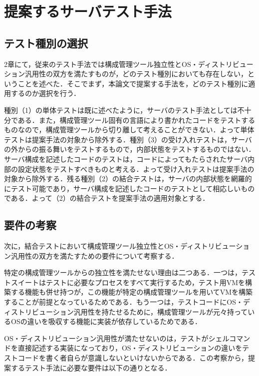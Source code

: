 \section{提案するサーバテスト手法}

\subsection{テスト種別の選択}

2章にて，従来のテスト手法では構成管理ツール独立性とOS・ディストリビューション汎用性の双方を満たすものが，どのテスト種別においても存在しない，ということを述べた．そこでまず，本論文で提案する手法を，どのテスト種別に適用するのか選択を行う．

種別（1）の単体テストは既に述べたように，サーバのテスト手法としては不十分である．また，構成管理ツール固有の言語により書かれたコードをテストするものなので，構成管理ツールから切り離して考えることができない．よって単体テストは提案手法の対象から除外する．種別（3）の受け入れテストは，サーバの外からの振る舞いをテストするもので，内部状態をテストするものではない．サーバ構成を記述したコードのテストは，コードによってもたらされたサーバ内部の設定状態をテストすべきものと考える．よって受け入れテストは提案手法の対象から除外する．残る種別（2）の結合テストは，サーバの内部状態を網羅的にテスト可能であり，サーバ構成を記述したコードのテストとして相応しいものである．よって（2）の結合テストを提案手法の適用対象とする．

\subsection{要件の考察}

次に，結合テストにおいて構成管理ツール独立性とOS・ディストリビューション汎用性の双方を満たすための要件について考察する．

特定の構成管理ツールからの独立性を満たせない理由は二つある．一つは，テストスイートはテストに必要なプロセスをすべて実行するため，テスト用VMを構築する機能も併せ持つが，この機能が特定の構成管理ツールを用いてVMを構築することが前提となっているためである．もう一つは，テストコードにOS・ディストリビューション汎用性を持たせるために，構成管理ツールが元々持っているOSの違いを吸収する機能に実装が依存しているためである．

OS・ディストリビューション汎用性が満たせないのは，テストがシェルコマンドを直接記述する実装になっており，OS・ディストリビューションの違いをテストコードを書く者自らが意識しないといけないからである．この考察から，提案するテスト手法に必要な要件は以下の通りとなる．

